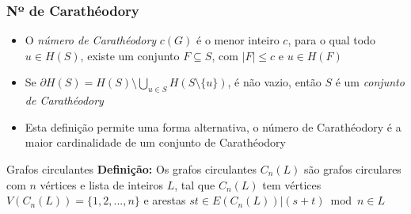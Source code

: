 \begin{frame}
      \frametitle{Nº de Carathéodory}


      \begin{itemize}
      \item{O \textit{número de Carathéodory} $c(G)$ é o menor inteiro $c$,
                        para o qual todo $u \in H(S)$, existe um conjunto $F \subseteq  S$,
                        com $|F| \le c$ e $u \in H(F)$}
                        
            \item{Se $\partial H(S)=H(S) \setminus \bigcup _{u \in S} H(S \setminus \{u\})$,
                        é não vazio, então $S$ é um \textit{conjunto de Carathéodory}}
            
            \item{Esta definição permite uma  forma alternativa,
                        o número de Carathéodory é a maior cardinalidade de um conjunto de Carathéodory}
      \end{itemize}
\end{frame}

%                   


\begin{frame}{Grafos circulantes}
      \textbf{Definição:} Os grafos circulantes $C_n(L)$ são grafos circulares com $n$ vértices e lista de inteiros $L$, tal que $C_n(L)$ tem vértices $V(C_n(L))=\{1,2,...,n\}$ e arestas $st\in E(C_n(L))| (s+t) \bmod n \in L$

      \vspace{0.5cm}

\end{frame}

